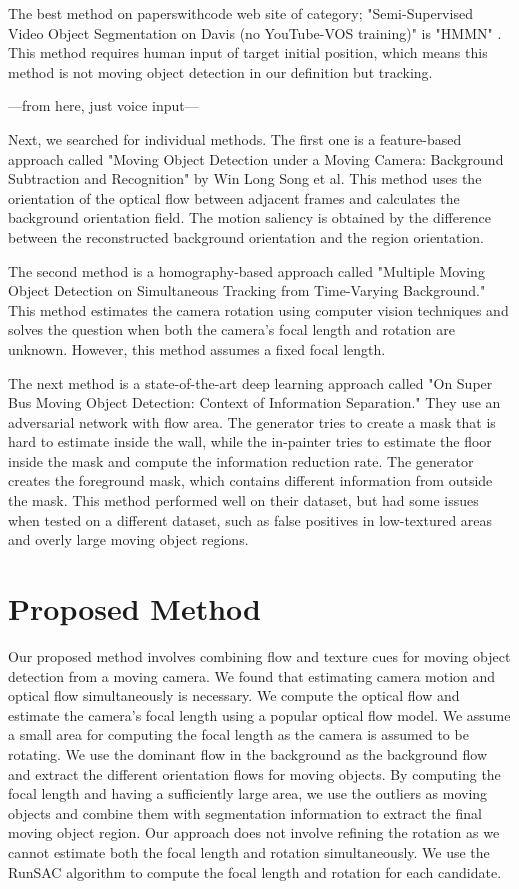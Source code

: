 \documentclass[10pt, twocolumn]{article}
\begin{document}
The best method on paperswithcode web site of category; "Semi-Supervised Video Object Segmentation on Davis (no YouTube-VOS training)" is "HMMN" \cite{DBLP:journals/corr/abs-2109-11404}.
This method requires human input of target initial position, which means this method is not moving object detection in our definition but tracking.

---from here, just voice input---

Next, we searched for individual methods. The first one is a feature-based approach called "Moving Object Detection under a Moving Camera: Background Subtraction and Recognition" by Win Long Song et al. This method uses the orientation of the optical flow between adjacent frames and calculates the background orientation field. The motion saliency is obtained by the difference between the reconstructed background orientation and the region orientation.

The second method is a homography-based approach called "Multiple Moving Object Detection on Simultaneous Tracking from Time-Varying Background." This method estimates the camera rotation using computer vision techniques and solves the question when both the camera's focal length and rotation are unknown. However, this method assumes a fixed focal length.

The next method is a state-of-the-art deep learning approach called "On Super Bus Moving Object Detection: Context of Information Separation." They use an adversarial network with flow area. The generator tries to create a mask that is hard to estimate inside the wall, while the in-painter tries to estimate the floor inside the mask and compute the information reduction rate. The generator creates the foreground mask, which contains different information from outside the mask. This method performed well on their dataset, but had some issues when tested on a different dataset, such as false positives in low-textured areas and overly large moving object regions.

\section{Proposed Method}
Our proposed method involves combining flow and texture cues for moving object detection from a moving camera. We found that estimating camera motion and optical flow simultaneously is necessary. We compute the optical flow and estimate the camera's focal length using a popular optical flow model. We assume a small area for computing the focal length as the camera is assumed to be rotating. We use the dominant flow in the background as the background flow and extract the different orientation flows for moving objects. By computing the focal length and having a sufficiently large area, we use the outliers as moving objects and combine them with segmentation information to extract the final moving object region. Our approach does not involve refining the rotation as we cannot estimate both the focal length and rotation simultaneously. We use the RunSAC algorithm to compute the focal length and rotation for each candidate.
\end{document}

